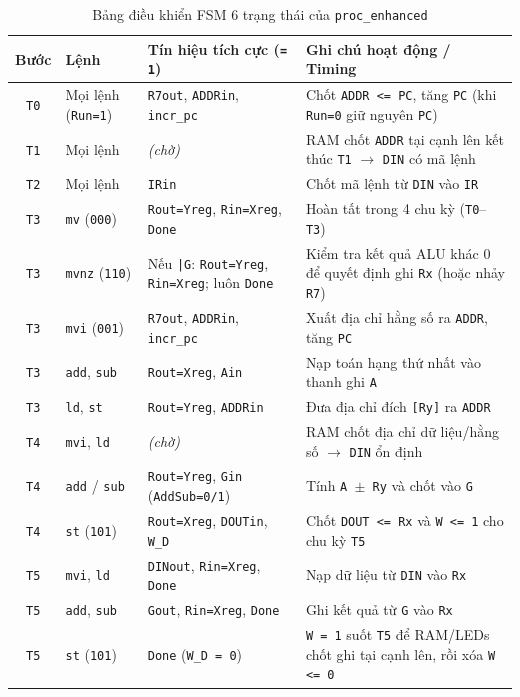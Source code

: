 \documentclass[11pt,a4paper]{article}
\newcommand{\code}[1]{\texttt{\small #1}}
\begin{document}
\begin{table}[H]
  \centering
  \caption{Bảng điều khiển FSM 6 trạng thái của \code{proc\_enhanced}}
  \label{tab:lab5_fsm}
  \footnotesize
  \renewcommand{\arraystretch}{1.12}
  \begin{tabularx}{\linewidth}{@{}c l l X@{}}
    \toprule
    \textbf{Bước} & \textbf{Lệnh} & \textbf{Tín hiệu tích cực (\code{= 1})} & \textbf{Ghi chú hoạt động / Timing} \\
    \midrule
    \code{T0} & Mọi lệnh (\code{Run=1}) & \code{R7out}, \code{ADDRin}, \code{incr\_pc} & Chốt \code{ADDR <= PC}, tăng \code{PC} (khi \code{Run=0} giữ nguyên \code{PC}) \\
    \code{T1} & Mọi lệnh & \textit{(chờ)} & RAM chốt \code{ADDR} tại cạnh lên kết thúc \code{T1} $\rightarrow$ \code{DIN} có mã lệnh \\
    \code{T2} & Mọi lệnh & \code{IRin} & Chốt mã lệnh từ \code{DIN} vào \code{IR} \\
    \midrule
    \code{T3} & \code{mv} (\code{000}) & \code{Rout=Yreg}, \code{Rin=Xreg}, \code{Done} & Hoàn tất trong 4 chu kỳ (\code{T0}--\code{T3}) \\
    \code{T3} & \code{mvnz} (\code{110}) & Nếu \code{|G}: \code{Rout=Yreg}, \code{Rin=Xreg}; luôn \code{Done} & Kiểm tra kết quả ALU khác 0 để quyết định ghi \code{Rx} (hoặc nhảy \code{R7}) \\
    \code{T3} & \code{mvi} (\code{001}) & \code{R7out}, \code{ADDRin}, \code{incr\_pc} & Xuất địa chỉ hằng số ra \code{ADDR}, tăng \code{PC} \\
    \code{T3} & \code{add}, \code{sub} & \code{Rout=Xreg}, \code{Ain} & Nạp toán hạng thứ nhất vào thanh ghi \code{A} \\
    \code{T3} & \code{ld}, \code{st} & \code{Rout=Yreg}, \code{ADDRin} & Đưa địa chỉ đích \code{[Ry]} ra \code{ADDR} \\
    \midrule
    \code{T4} & \code{mvi}, \code{ld} & \textit{(chờ)} & RAM chốt địa chỉ dữ liệu/hằng số $\rightarrow$ \code{DIN} ổn định \\
    \code{T4} & \code{add} / \code{sub} & \code{Rout=Yreg}, \code{Gin} (\code{AddSub=0/1}) & Tính \code{A $\pm$ Ry} và chốt vào \code{G} \\
    \code{T4} & \code{st} (\code{101}) & \code{Rout=Xreg}, \code{DOUTin}, \code{W\_D} & Chốt \code{DOUT <= Rx} và \code{W <= 1} cho chu kỳ \code{T5} \\
    \midrule
    \code{T5} & \code{mvi}, \code{ld} & \code{DINout}, \code{Rin=Xreg}, \code{Done} & Nạp dữ liệu từ \code{DIN} vào \code{Rx} \\
    \code{T5} & \code{add}, \code{sub} & \code{Gout}, \code{Rin=Xreg}, \code{Done} & Ghi kết quả từ \code{G} vào \code{Rx} \\
    \code{T5} & \code{st} (\code{101}) & \code{Done} (\code{W\_D = 0}) & \code{W = 1} suốt \code{T5} để RAM/LEDs chốt ghi tại cạnh lên, rồi xóa \code{W <= 0} \\
    \bottomrule
  \end{tabularx}
\end{table}
\end{document}
